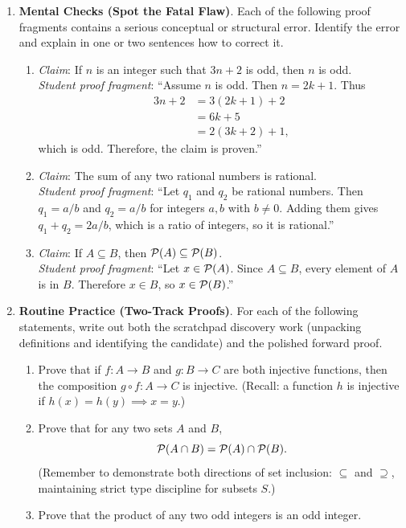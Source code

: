 \begin{enumerate}
  \item \textbf{Mental Checks (Spot the Fatal Flaw)}. Each of the following proof fragments contains a serious conceptual or structural error. Identify the error and explain in one or two sentences how to correct it.
  \begin{enumerate}
    \item \emph{Claim}: If $n$ is an integer such that $3n + 2$ is odd, then $n$ is odd. \\
    \emph{Student proof fragment}: ``Assume $n$ is odd. Then $n = 2k + 1$. Thus
    \begin{align*}
    3n + 2 &= 3(2k + 1) + 2\\
    &= 6k + 5\\
    &= 2(3k + 2) + 1,
    \end{align*}
    which is odd. Therefore, the claim is proven.''
    \item \emph{Claim}: The sum of any two rational numbers is rational. \\
    \emph{Student proof fragment}: ``Let $q_1$ and $q_2$ be rational numbers. Then $q_1 = a/b$ and $q_2 = a/b$ for integers $a, b$ with $b \neq 0$. Adding them gives $q_1 + q_2 = 2a/b$, which is a ratio of integers, so it is rational.''
    \item \emph{Claim}: If $A \subseteq B$, then $\mathcal{P}(A) \subseteq \mathcal{P}(B)$. \\
    \emph{Student proof fragment}: ``Let $x \in \mathcal{P}(A)$. Since $A \subseteq B$, every element of $A$ is in $B$. Therefore $x \in B$, so $x \in \mathcal{P}(B)$.''
  \end{enumerate}

  \item \textbf{Routine Practice (Two-Track Proofs)}. For each of the following statements, write out both the scratchpad discovery work (unpacking definitions and identifying the candidate) and the polished forward proof.
  \begin{enumerate}
    \item Prove that if $f: A \to B$ and $g: B \to C$ are both injective functions, then the composition $g \circ f: A \to C$ is injective. (Recall: a function $h$ is injective if $h(x) = h(y) \implies x = y$.)
    \item Prove that for any two sets $A$ and $B$,
    \[
    \mathcal{P}(A \cap B) = \mathcal{P}(A) \cap \mathcal{P}(B).
    \]
    (Remember to demonstrate both directions of set inclusion: $\subseteq$ and $\supseteq$, maintaining strict type discipline for subsets $S$.)
    \item Prove that the product of any two odd integers is an odd integer.
  \end{enumerate}


\end{enumerate}
